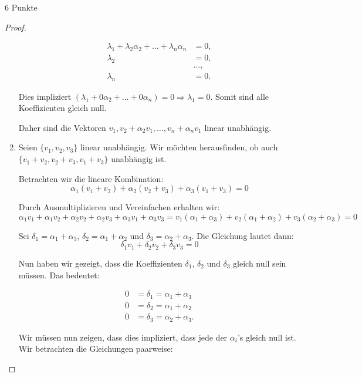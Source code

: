 \documentclass{problemset}
\begin{document}
\begin{problem}{6 Punkte}
\begin{proof}
\begin{enumerate}
		      \begin{align*}
			      \lambda_1 + \lambda_2\alpha_2 + \ldots + \lambda_n\alpha_n & = 0,    \\
			      \lambda_2                                                  & = 0,    \\
			                                                                 & \ldots, \\
			      \lambda_n                                                  & = 0.
		      \end{align*}

		      Dies impliziert $(\lambda_1 + 0\alpha_2 + \ldots + 0\alpha_n) = 0 \Rightarrow \lambda_1 = 0$.
		      Somit sind alle Koeffizienten gleich null.

		      Daher sind die Vektoren $v_1, v_2 + \alpha_2v_1, \ldots, v_n + \alpha_nv_1$ linear unabhängig.

		\item Seien \(\{v_1, v_2, v_3\}\) linear unabhängig. Wir möchten herausfinden, ob auch \(\{v_1+v_2, v_2+v_3, v_1+v_3\}\) unabhängig ist.

		      Betrachten wir die lineare Kombination:
		      \[
			      \alpha_1(v_1+v_2) + \alpha_2(v_2+v_3) + \alpha_3(v_1+v_3) = 0
		      \]

		      Durch Ausmultiplizieren und Vereinfachen erhalten wir:
		      \[
			      \alpha_1v_1 + \alpha_1v_2 + \alpha_2v_2 + \alpha_2v_3 + \alpha_3v_1 + \alpha_3v_3 = v_1(\alpha_1+\alpha_3) + v_2(\alpha_1+\alpha_2) + v_3(\alpha_2+\alpha_3) = 0
		      \]

		      Sei \(\delta_1 = \alpha_1 + \alpha_3\), \(\delta_2 = \alpha_1 + \alpha_2\) und \(\delta_3 = \alpha_2 + \alpha_3\). Die Gleichung lautet dann:
		      \[
			      \delta_1v_1 + \delta_2v_2 + \delta_3v_3 = 0
		      \]

		      Nun haben wir gezeigt, dass die Koeffizienten \(\delta_1\), \(\delta_2\) und \(\delta_3\) gleich null sein müssen. Das bedeutet:

		      \begin{align*}
			      0 & = \delta_1 = \alpha_1 + \alpha_3  \\
			      0 & = \delta_2 = \alpha_1 + \alpha_2  \\
			      0 & = \delta_3 = \alpha_2 + \alpha_3.
		      \end{align*}

		      Wir müssen nun zeigen, dass dies impliziert, dass jede der \(\alpha_i\)'s gleich null ist. Wir betrachten die Gleichungen paarweise:


\end{enumerate}
\end{proof}
\end{problem}
\end{document}
